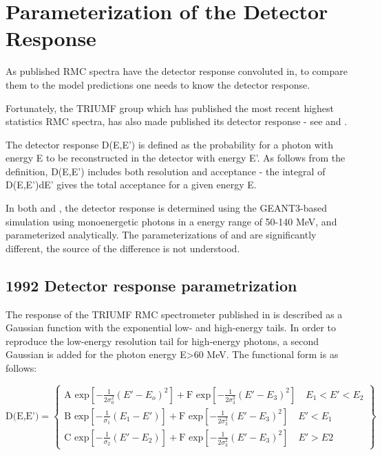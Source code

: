 \section { Parameterization of the Detector Response}

As published RMC spectra have the detector response convoluted in, to compare
them to the model predictions one needs to know the detector response.

Fortunately, the TRIUMF group which has published the most recent highest statistics
RMC spectra, has also made published its detector response -
see \cite{RMC_1992_PhysRevC.46.1094} and \cite{RMC_1998_PhysRevC.58.1767}. 

The detector response D(E,E') is defined as the probability for a photon
with energy E to be reconstructed in the detector with energy E'. As follows from the
definition, D(E,E') includes both resolution and acceptance - the integral of D(E,E')dE'
gives the total acceptance for a given energy E.

In both \cite{RMC_1992_PhysRevC.46.1094} and \cite{RMC_1998_PhysRevC.58.1767}, the
detector response is determined using the GEANT3-based simulation using monoenergetic
photons in a energy range of 50-140 MeV, and parameterized analytically.
The parameterizations of  \cite{RMC_1992_PhysRevC.46.1094} and \cite{RMC_1998_PhysRevC.58.1767}
are significantly different, the source of the difference is not understood.

\subsection { 1992 Detector response parametrization }

The response of the TRIUMF RMC spectrometer published in \cite{RMC_1992_PhysRevC.46.1094}
is described as a Gaussian function with the exponential low- and  high-energy tails.
In order to reproduce the low-energy resolution tail for high-energy photons, a second Gaussian
is added for the photon energy E>60 MeV. The functional form is as follows:

\begin{equation}
  \label{eq:001}
\text{D(E,E')}= \left\{
\begin{array}{ll}
                \text{A exp}\left[-\frac{1}{2\sigma_0^2}(E'-E_o)^2\right]+
                \text{F exp}\left[-\frac{1}{2\sigma_3^2}(E'-E_3)^2\right]
 \quad E_1<E'<E_2 \\
                \text{B exp}\left[-\frac{1}{\sigma_1}(E_1-E') \right]+
                \text{F exp}\left[-\frac{1}{2\sigma_3^2}(E'-E_3)^2\right]
 \quad E'<E_1      \\  
                \text{C exp}\left[-\frac{1}{\sigma_2}(E'-E_2)\right]+
                \text{F exp}\left[-\frac{1}{2\sigma_3^2}(E'-E_3)^2\right]
 \quad E'>E2     
 \end{array}
 \right\}
\end{equation}
 
